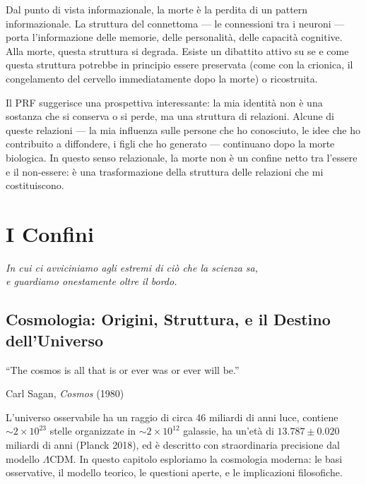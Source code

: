 \documentclass[11.5pt,a4paper,openany]{book}
\theoremstyle{remark}
\begin{document}
Dal punto di vista informazionale, la morte è la perdita di un pattern informazionale. La struttura del connettoma --- le connessioni tra i neuroni --- porta l'informazione delle memorie, delle personalità, delle capacità cognitive. Alla morte, questa struttura si degrada. Esiste un dibattito attivo su se e come questa struttura potrebbe in principio essere preservata (come con la crionica, il congelamento del cervello immediatamente dopo la morte) o ricostruita.

Il PRF suggerisce una prospettiva interessante: la mia identità non è una sostanza che si conserva o si perde, ma una struttura di relazioni. Alcune di queste relazioni --- la mia influenza sulle persone che ho conosciuto, le idee che ho contribuito a diffondere, i figli che ho generato --- continuano dopo la morte biologica. In questo senso relazionale, la morte non è un confine netto tra l'essere e il non-essere: è una trasformazione della struttura delle relazioni che mi costituiscono.

\part{I Confini}

\begin{center}\itshape
In cui ci avviciniamo agli estremi di ciò che la scienza sa,\\
e guardiamo onestamente oltre il bordo.
\end{center}
\clearpage

\chapter{Cosmologia: Origini, Struttura, e il Destino dell'Universo}

\epigraph{``The cosmos is all that is or ever was or ever will be.''}{Carl Sagan, \textit{Cosmos} (1980)}

L'universo osservabile ha un raggio di circa 46 miliardi di anni luce, contiene $\sim 2 \times 10^{23}$ stelle organizzate in $\sim 2 \times 10^{12}$ galassie, ha un'età di $13.787 \pm 0.020$ miliardi di anni (Planck 2018), ed è descritto con straordinaria precisione dal modello $\Lambda$CDM. In questo capitolo esploriamo la cosmologia moderna: le basi osservative, il modello teorico, le questioni aperte, e le implicazioni filosofiche.
\end{document}
